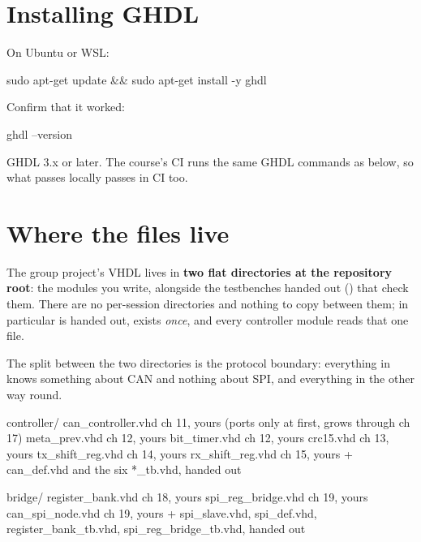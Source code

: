 \section{Installing GHDL}
\label{app:sim:install}

On Ubuntu or WSL:

\begin{shell}
sudo apt-get update && sudo apt-get install -y ghdl
\end{shell}

Confirm that it worked:

\begin{shell}
ghdl --version
\end{shell}

GHDL 3.x or later. The course's CI runs the same GHDL commands as below, so what passes locally passes
in CI too.

\section{Where the files live}
\label{app:sim:layout}

The group project's VHDL lives in \textbf{two flat directories at the repository root}: the modules
you write, alongside the testbenches handed out () that check them. There are no
per-session directories and nothing to copy between them;  in particular is handed
out, exists \emph{once}, and every controller module reads that one file.

The split between the two directories is the protocol boundary: everything in 
knows something about CAN and nothing about SPI, and everything in  the other way
round.

\begin{textdrawing}
controller/   can_controller.vhd     ch 11, yours (ports only at first, grows through ch 17)
              meta_prev.vhd          ch 12, yours
              bit_timer.vhd          ch 12, yours
              crc15.vhd              ch 13, yours
              tx_shift_reg.vhd       ch 14, yours
              rx_shift_reg.vhd       ch 15, yours
              + can_def.vhd and the six *_tb.vhd, handed out

bridge/       register_bank.vhd      ch 18, yours
              spi_reg_bridge.vhd     ch 19, yours
              can_spi_node.vhd       ch 19, yours
              + spi_slave.vhd, spi_def.vhd, register_bank_tb.vhd,
                spi_reg_bridge_tb.vhd, handed out
\end{textdrawing}


